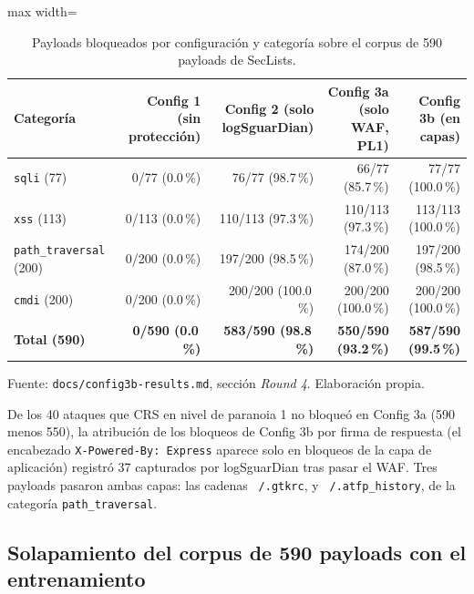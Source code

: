\begin{table}[htbp]
\centering
\footnotesize
\setlength{\tabcolsep}{3pt}
\begin{adjustbox}{max width=\linewidth}
\begin{tabular}{|l|r|r|r|r|}
\hline
\textbf{Categoría} & \textbf{Config 1 (sin protección)} & \textbf{Config 2 (solo logSguarDian)} & \textbf{Config 3a (solo WAF, PL1)} & \textbf{Config 3b (en capas)} \\ \hline
\texttt{sqli} (77) & 0/77 (0.0\,\%) & 76/77 (98.7\,\%) & 66/77 (85.7\,\%) & 77/77 (100.0\,\%) \\ \hline
\texttt{xss} (113) & 0/113 (0.0\,\%) & 110/113 (97.3\,\%) & 110/113 (97.3\,\%) & 113/113 (100.0\,\%) \\ \hline
\texttt{path\_traversal} (200) & 0/200 (0.0\,\%) & 197/200 (98.5\,\%) & 174/200 (87.0\,\%) & 197/200 (98.5\,\%) \\ \hline
\texttt{cmdi} (200) & 0/200 (0.0\,\%) & 200/200 (100.0\,\%) & 200/200 (100.0\,\%) & 200/200 (100.0\,\%) \\ \hline
\textbf{Total (590)} & \textbf{0/590 (0.0\,\%)} & \textbf{583/590 (98.8\,\%)} & \textbf{550/590 (93.2\,\%)} & \textbf{587/590 (99.5\,\%)} \\ \hline
\end{tabular}
\end{adjustbox}
\caption{Payloads bloqueados por configuración y categoría sobre el corpus de 590 payloads de SecLists.}
\label{tabla:res-config3-corpus}
\par\smallskip\footnotesize Fuente: \texttt{docs/config3b-results.md}, sección \textit{Round 4}. Elaboración propia.
\end{table}

De los 40 ataques que CRS en nivel de paranoia 1 no bloqueó en Config 3a (590 menos 550), la atribución de los bloqueos de Config 3b por firma de respuesta (el encabezado \texttt{X-Powered-By: Express} aparece solo en bloqueos de la capa de aplicación) registró 37 capturados por logSguarDian tras pasar el WAF. Tres payloads pasaron ambas capas: las cadenas \texttt{\string~/.gtkrc},  y \texttt{\string~/.atfp\_history}, de la categoría \texttt{path\_traversal}.

\subsection{Solapamiento del corpus de 590 payloads con el entrenamiento}\label{sec:solapamiento-corpus}

